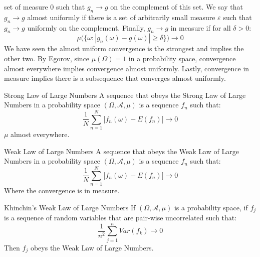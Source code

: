             set of measure 0 such that $g_{n}\rightarrow{g}$ on the
            complement of this set. We say that
            $g_{n}\rightarrow{g}$ almost uniformly if there is a set
            of arbitrarily small measure $\varepsilon$ such that
            $g_{n}\rightarrow{g}$ uniformly on the complement.
            Finally, $g_{n}\rightarrow{g}$ in measure if for all
            $\delta>0$:
            \begin{equation}
                \mu\Big(\{\omega:|g_{n}(\omega)-g(\omega)|\geq\delta\}
                \Big)\rightarrow{0}
            \end{equation}
            We have seen the almost uniform convergence is the
            strongest and implies the other two. By Egorov, since
            $\mu(\Omega)=1$ in a probability space,
            convergence almost everywhere implies convergence almost
            uniformly. Lastly, convergence in measure implies there
            is a subsequence that converges almost uniformly.
            \begin{ldefinition}{Strong Law of Large Numbers}
                A sequence that obeys the Strong Law of Large Numbers
                in a probability space $(\Omega,\mathcal{A},\mu)$
                is a sequence $f_{n}$ such that:
                \begin{equation}
                    \frac{1}{N}\sum_{n=1}^{N}
                        \Big[f_{n}(\omega)-E(f_{n})\Big]\rightarrow{0}
                \end{equation}
                $\mu$ almost everywhere.
            \end{ldefinition}
            \begin{ldefinition}{Weak Law of Large Numbers}
                A sequence that obeys the Weak Law of Large Numbers
                in a probability space $(\Omega,\mathcal{A},\mu)$
                is a sequence $f_{n}$ such that:
                \begin{equation}
                    \frac{1}{N}\sum_{n=1}^{N}
                        \Big[f_{n}(\omega)-E(f_{n})\Big]\rightarrow{0}
                \end{equation}
                Where the convergence is in measure.
            \end{ldefinition}
            \begin{ltheorem}{Khinchin's Weak Law of Large Numbers}
                If $(\Omega,\mathcal{A},\mu)$ is a probability space,
                if $f_{j}$ is a sequence of random variables that
                are pair-wise uncorrelated such that:
                \begin{equation}
                    \frac{1}{n^{2}}\sum_{j=1}^{n}Var(f_{k})
                    \rightarrow{0}
                \end{equation}
                Then $f_{j}$ obeys the Weak Law of Large Numbers.
            \end{ltheorem}

